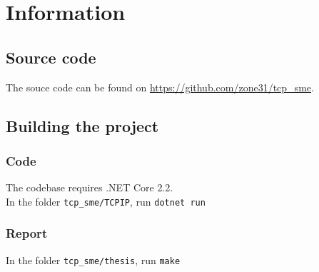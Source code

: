 \chapter{Information} \label{chap:appendix_information}
\section{Source code}
The souce code can be found on \url{https://github.com/zone31/tcp_sme}.
\section{Building the project}
\subsection{Code}
The codebase requires .NET Core 2.2. \\
In the folder \texttt{tcp\_sme/TCPIP}, run \texttt{dotnet run}
\subsection{Report}
In the folder \texttt{tcp\_sme/thesis}, run \texttt{make}
